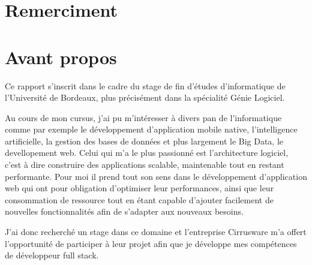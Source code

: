 \section{Remerciment}

\newpage
\section{Avant propos}
Ce rapport s'inscrit dans le cadre du stage de fin d'études d'informatique de l'Université de Bordeaux, plus précisément dans la spécialité Génie Logiciel.

Au cours de mon cursus, j'ai pu m'intéresser à divers pan de l'informatique comme par exemple le développement d'application mobile native, l'intelligence artificielle, la gestion des bases de données et plus largement le Big Data, le devellopement web. Celui qui m'a le plus passionné est l'architecture logiciel, c'est à dire construire des applications scalable, maintenable tout en restant performante. Pour moi il prend tout son sens dans le développement d'application web qui ont pour obligation d'optimiser leur performances, ainsi que leur consommation de ressource tout en étant capable d'ajouter facilement de nouvelles fonctionnalités afin de s'adapter aux nouveaux besoins.

J'ai donc recherché un stage dans ce domaine et l'entreprise Cirrusware m'a offert l'opportunité de participer à leur projet afin que je développe mes compétences de développeur full stack. 





